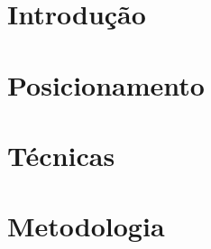 \documentclass[a4paper,12pt,oneside,openany]{book}
\begin{document}
\frontmatter
\thispagestyle{empty}



\pagebreak



\tableofcontents
\listoffigures
\listoftables

\mainmatter
\cleardoublepage
\chapter{Introdução}
\label{introducao}


\chapter{Posicionamento}
\label{posicao}


\chapter{Técnicas}
\label{tecnicas}


\chapter{Metodologia}
\label{metodologia}


\end{document}
